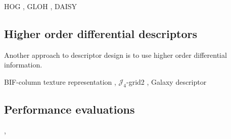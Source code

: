 \documentclass[../thesis.tex]{subfiles}
\begin{document}
HOG \cite{dalal2005histograms},
GLOH \cite{mikolajczyk2005performance},
DAISY \cite{tola2008fast,winder2009picking}

\subsection{Higher order differential descriptors}

Another approach to descriptor design is to use higher order differential
information.

BIF-column texture representation \cite{crosier2010using},
$\mathcal{J}_4$-grid2 \cite{larsen2012jet},
Galaxy descriptor \cite{pedersen2013shape}

\subsection{Performance evaluations}

\cite{mikolajczyk2005performance},
\cite{dahl2011finding}

\subbibliography
\end{document}
